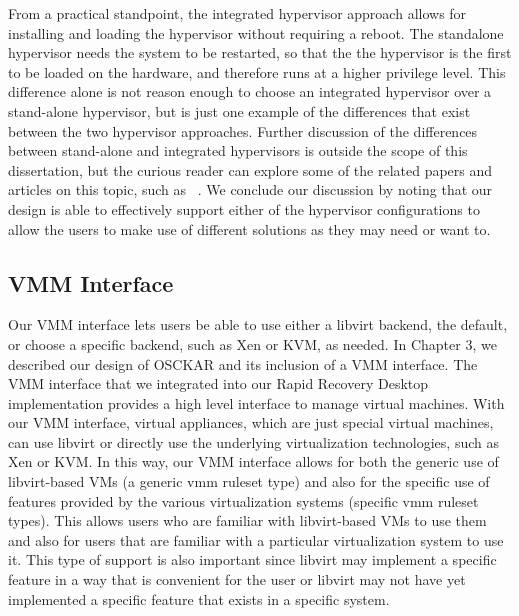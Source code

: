 From a practical standpoint, the integrated hypervisor approach allows for installing and loading the hypervisor without requiring a reboot. The standalone hypervisor needs the system to be restarted, so that the the hypervisor is the first to be loaded on the hardware, and therefore runs at a higher privilege level. This difference alone is not reason enough to choose an integrated hypervisor over a stand-alone hypervisor, but is just one example of the differences that exist between the two hypervisor approaches. Further discussion of the differences between stand-alone and integrated hypervisors is outside the scope of this dissertation, but the curious reader can explore some of the related papers and articles on this topic, such as ~\cite{kvm_ols07, clark_2004, kvm_vs_xen_at_xen_summit_2008, redhat_rhel_54_2009, crosby_xen_dead_2008, cnet_hypervisor_2010, crosby_novell_2010, liguori_truth_2008,rhev_2009,qubes-os_2010}. We conclude our discussion by noting that our design is able to effectively support either of the hypervisor configurations to allow the users to make use of different solutions as they may need or want to.

\subsection{VMM Interface}
\label{sec:vmm-implementation}


Our VMM interface lets users be able to use either a libvirt backend, the default, or choose a specific backend, such as Xen or KVM, as needed. In Chapter 3, we described our design of OSCKAR and its inclusion of a VMM interface. The VMM interface that we integrated into our Rapid Recovery Desktop implementation provides a high level interface to manage virtual machines. With our VMM interface, virtual appliances, which are just special virtual machines, can use libvirt or directly use the underlying virtualization technologies, such as Xen or KVM. In this way, our VMM interface allows for both the generic use of libvirt-based VMs (a generic vmm ruleset type) and also for the specific use of features provided by the various virtualization systems (specific vmm ruleset types). This allows users who are familiar with libvirt-based VMs to use them and also for users that are familiar with a particular virtualization system to use it. This type of support is also important since libvirt may implement a specific feature in a way that is convenient for the user or libvirt may not have yet implemented a specific feature that exists in a specific system. 

